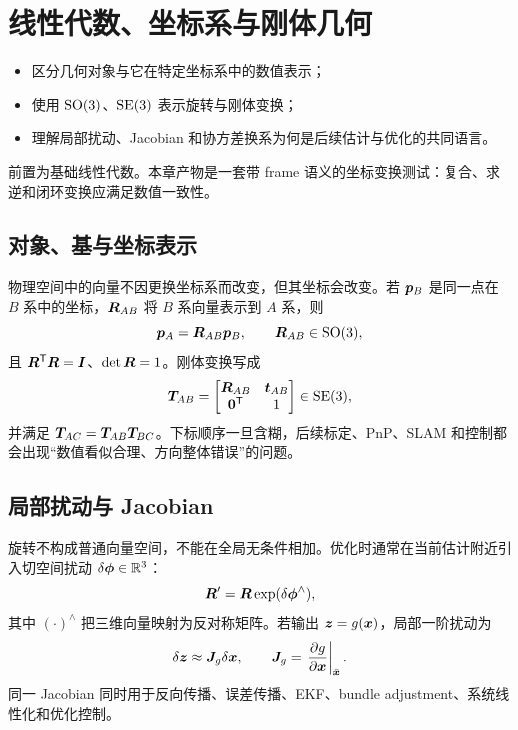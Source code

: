 \chapter{线性代数、坐标系与刚体几何}
\label{ch:geometry}

\begin{learningobjectives}
\begin{itemize}
  \item 区分几何对象与它在特定坐标系中的数值表示；
  \item 使用 $\mathrm{SO}(3)$、$\mathrm{SE}(3)$ 表示旋转与刚体变换；
  \item 理解局部扰动、Jacobian 和协方差换系为何是后续估计与优化的共同语言。
\end{itemize}
\end{learningobjectives}

\begin{prerequisites}
前置为基础线性代数。本章产物是一套带 frame 语义的坐标变换测试：复合、求逆和闭环变换应满足数值一致性。
\end{prerequisites}

\section{对象、基与坐标表示}

物理空间中的向量不因更换坐标系而改变，但其坐标会改变。若 $\bm{p}_B$ 是同一点在 $B$ 系中的坐标，$\bm{R}_{AB}$ 将 $B$ 系向量表示到 $A$ 系，则
\begin{equation}
  \bm{p}_A=\bm{R}_{AB}\bm{p}_B,
  \qquad
  \bm{R}_{AB}\in\mathrm{SO}(3),
\end{equation}
且 $\bm{R}^{\mathsf T}\bm{R}=\bm{I}$、$\det\bm{R}=1$。刚体变换写成
\begin{equation}
  \bm{T}_{AB}=
  \begin{bmatrix}
    \bm{R}_{AB} & \bm{t}_{AB}\\
    \bm{0}^{\mathsf T} & 1
  \end{bmatrix}\in\mathrm{SE}(3),
\end{equation}
并满足 $\bm{T}_{AC}=\bm{T}_{AB}\bm{T}_{BC}$。下标顺序一旦含糊，后续标定、PnP、SLAM 和控制都会出现“数值看似合理、方向整体错误”的问题。

\section{局部扰动与 Jacobian}

旋转不构成普通向量空间，不能在全局无条件相加。优化时通常在当前估计附近引入切空间扰动 $\delta\bm{\phi}\in\mathbb{R}^3$：
\begin{equation}
  \bm{R}'=\bm{R}\exp(\delta\bm{\phi}^{\wedge}),
\end{equation}
其中 $(\cdot)^{\wedge}$ 把三维向量映射为反对称矩阵。若输出 $\bm{z}=g(\bm{x})$，局部一阶扰动为
\begin{equation}
  \delta\bm{z}\approx \bm{J}_g\delta\bm{x},
  \qquad
  \bm{J}_g=\left.\frac{\partial g}{\partial \bm{x}}\right|_{\bar{\bm{x}}}.
\end{equation}
同一 Jacobian 同时用于反向传播、误差传播、EKF、bundle adjustment、系统线性化和优化控制。

